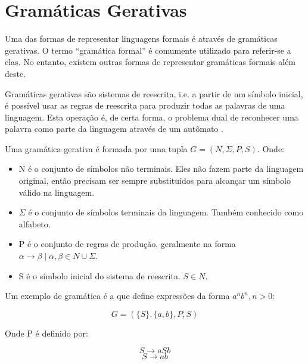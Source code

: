 \documentclass[a4paper,12pt,oneside,onecolumn]{uerj}
\begin{document}
\section{Gramáticas Gerativas}

Uma das formas de representar linguagens formais é através de gramáticas gerativas. O termo ``gramática formal'' é comumente utilizado para referir-se a elas. No entanto, existem outras formas de representar gramáticas formais além deste.

Gramáticas gerativas são sistemas de reescrita, i.e. a partir de um símbolo inicial, é possível usar as regras de reescrita para produzir todas as palavras de uma linguagem. Esta operação é, de certa forma, o problema dual de reconhecer uma palavra como parte da linguagem através de um autômato \cite{bib:Ruohonen09}.

Uma gramática gerativa é formada por uma tupla $G = (N, \Sigma, P, S)$. Onde:

\begin{itemize}
    \item N é o conjunto de símbolos não terminais. Eles não fazem parte da linguagem original, então precisam ser sempre substituídos para alcançar um símbolo válido na linguagem.
    \item $\Sigma$ é o conjunto de símbolos terminais da linguagem. Também conhecido como alfabeto.
    \item P é o conjunto de regras de produção, geralmente na forma $\alpha \rightarrow \beta \mid \alpha, \beta \in N \cup \Sigma$.
    \item S é o símbolo inicial do sistema de reescrita. $S \in N$.
\end{itemize}

Um exemplo de gramática é a que define expressões da forma $a^nb^n, n>0$:

\begin{equation*}
	G = ({\{S\}, \{a,b\}, P, S})
\end{equation*}

Onde P é definido por:

\begin{equation*}
	S \rightarrow aSb
\end{equation*}
\begin{equation*}
	S \rightarrow ab
\end{equation*}
\end{document}
